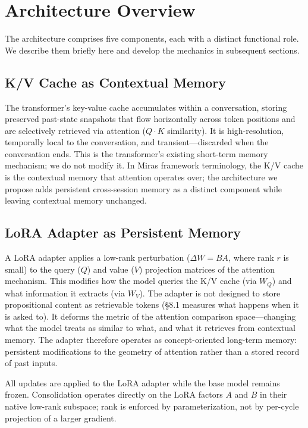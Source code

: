 \documentclass[11pt]{article}
\begin{document}
\section{Architecture Overview}

The architecture comprises five components, each with a distinct functional role. We describe them briefly here and develop the mechanics in subsequent sections.

\subsection{K/V Cache as Contextual Memory}

The transformer's key-value cache accumulates within a conversation, storing preserved past-state snapshots that flow horizontally across token positions and are selectively retrieved via attention ($Q \cdot K$ similarity). It is high-resolution, temporally local to the conversation, and transient---discarded when the conversation ends. This is the transformer's existing short-term memory mechanism; we do not modify it. In Miras framework terminology, the K/V cache is the contextual memory that attention operates over; the architecture we propose adds persistent cross-session memory as a distinct component while leaving contextual memory unchanged.

\subsection{LoRA Adapter as Persistent Memory}

A LoRA adapter \cite{hu2021} applies a low-rank perturbation ($\Delta W = BA$, where rank $r$ is small) to the query ($Q$) and value ($V$) projection matrices of the attention mechanism. This modifies how the model queries the K/V cache (via $W_Q$) and what information it extracts (via $W_V$). The adapter is not designed to store propositional content as retrievable tokens (\S 8.1 measures what happens when it is asked to). It deforms the metric of the attention comparison space---changing what the model treats as similar to what, and what it retrieves from contextual memory. The adapter therefore operates as concept-oriented long-term memory: persistent modifications to the geometry of attention rather than a stored record of past inputs.

All updates are applied to the LoRA adapter while the base model remains frozen. Consolidation operates directly on the LoRA factors $A$ and $B$ in their native low-rank subspace; rank is enforced by parameterization, not by per-cycle projection of a larger gradient.
\end{document}
